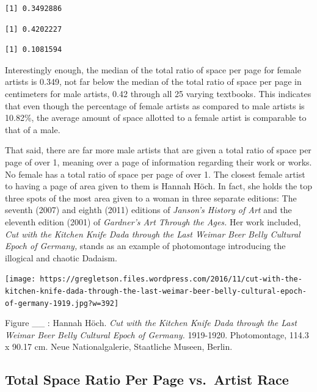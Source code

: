 \documentclass[
  letterpaper,
  DIV=11,
  numbers=noendperiod]{scrreprt}
\begin{document}
\begin{verbatim}
[1] 0.3492886
\end{verbatim}

\begin{verbatim}
[1] 0.4202227
\end{verbatim}

\begin{verbatim}
[1] 0.1081594
\end{verbatim}

Interestingly enough, the median of the total ratio of space per page
for female artists is 0.349, not far below the median of the total ratio
of space per page in centimeters for male artists, 0.42 through all 25
varying textbooks\emph{.} This indicates that even though the percentage
of female artists as compared to male artists is 10.82\%, the average
amount of space allotted to a female artist is comparable to that of a
male.

That said, there are far more male artists that are given a total ratio
of space per page of over 1, meaning over a page of information
regarding their work or works. No female has a total ratio of space per
page of over 1. The closest female artist to having a page of area given
to them is Hannah Höch. In fact, she holds the top three spots of the
most area given to a woman in three separate editions: The seventh
(2007) and eighth (2011) editions of \emph{Janson's History of Art} and
the eleventh edition (2001) of \emph{Gardner's Art Through the Ages.}
Her work included, \emph{Cut with the Kitchen Knife Dada through the
Last Weimar Beer Belly Cultural Epoch of Germany,} stands as an example
of photomontage introducing the illogical and chaotic Dadaism.

\texttt{[image: https://gregletson.files.wordpress.com/2016/11/cut-with-the-kitchen-knife-dada-through-the-last-weimar-beer-belly-cultural-epoch-of-germany-1919.jpg?w=392]}

Figure \_\_ : Hannah Höch. \emph{Cut with the Kitchen Knife Dada through
the Last Weimar Beer Belly Cultural Epoch of Germany.} 1919-1920.
Photomontage, 114.3 x 90.17 cm. Neue Nationalgalerie, Staatliche Museen,
Berlin.

\hypertarget{total-space-ratio-per-page-vs.-artist-race}{%
\subsection{Total Space Ratio Per Page vs.~Artist
Race}\label{total-space-ratio-per-page-vs.-artist-race}}
\end{document}
